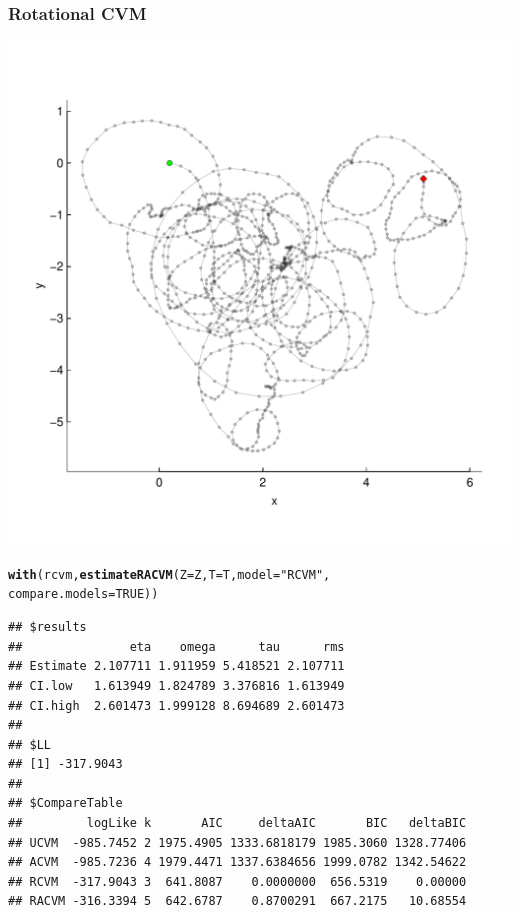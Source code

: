 \documentclass[10pt]{article}\usepackage[]{graphicx}\usepackage[]{color}
\makeatletter
\def\maxwidth{ %
  \ifdim\Gin@nat@width>\linewidth
    \linewidth
  \else
    \Gin@nat@width
  \fi
}
\newcommand{\hlnum}[1]{\textcolor[rgb]{0.686,0.059,0.569}{#1}}%
\newcommand{\hlstr}[1]{\textcolor[rgb]{0.192,0.494,0.8}{#1}}%
\newcommand{\hlstd}[1]{\textcolor[rgb]{0.345,0.345,0.345}{#1}}%
\newcommand{\hlkwc}[1]{\textcolor[rgb]{0.333,0.667,0.333}{#1}}%
\newcommand{\hlkwd}[1]{\textcolor[rgb]{0.737,0.353,0.396}{\textbf{#1}}}%
\newenvironment{kframe}{%
 \def\at@end@of@kframe{}%
 \ifinner\ifhmode%
  \def\at@end@of@kframe{\end{minipage}}%
  \begin{minipage}{\columnwidth}%
 \fi\fi%
 \def\FrameCommand##1{\hskip\@totalleftmargin \hskip-\fboxsep
 \colorbox{shadecolor}{##1}\hskip-\fboxsep
     \hskip-\linewidth \hskip-\@totalleftmargin \hskip\columnwidth}%
 \MakeFramed {\advance\hsize-\width
   \@totalleftmargin\z@ \linewidth\hsize
   \@setminipage}}%
 {\par\unskip\endMakeFramed%
 \at@end@of@kframe}
\newenvironment{knitrout}{}{} %
\makeatother
\begin{document}
\subsubsection{Rotational CVM}
     \begin{minipage}{0.4\linewidth}   
\begin{knitrout}
\color{fgcolor}
\includegraphics[width=\maxwidth]{figure/rcvm-1} 

\end{knitrout}
   \end{minipage}
  \begin{minipage}{0.6\linewidth}
\begin{knitrout}\small
{}\color{fgcolor}\begin{kframe}
\begin{alltt}
\hlkwd{with}\hlstd{(rcvm,} \hlkwd{estimateRACVM}\hlstd{(}\hlkwc{Z}\hlstd{=Z,} \hlkwc{T}\hlstd{=T,} \hlkwc{model} \hlstd{=} \hlstr{"RCVM"}\hlstd{,}
                         \hlkwc{compare.models}\hlstd{=}\hlnum{TRUE}\hlstd{))}
\end{alltt}
\begin{verbatim}
## $results
##               eta    omega      tau      rms
## Estimate 2.107711 1.911959 5.418521 2.107711
## CI.low   1.613949 1.824789 3.376816 1.613949
## CI.high  2.601473 1.999128 8.694689 2.601473
## 
## $LL
## [1] -317.9043
## 
## $CompareTable
##         logLike k       AIC     deltaAIC       BIC   deltaBIC
## UCVM  -985.7452 2 1975.4905 1333.6818179 1985.3060 1328.77406
## ACVM  -985.7236 4 1979.4471 1337.6384656 1999.0782 1342.54622
## RCVM  -317.9043 3  641.8087    0.0000000  656.5319    0.00000
## RACVM -316.3394 5  642.6787    0.8700291  667.2175   10.68554
\end{verbatim}
\end{kframe}
\end{knitrout}
     \end{minipage}
\end{document}
